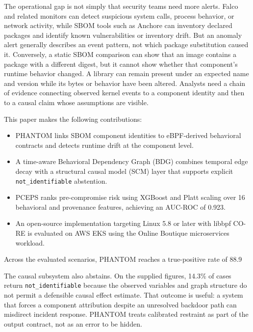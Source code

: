 \documentclass[conference]{IEEEtran}
\begin{document}
The operational gap is not simply that security teams need more alerts. Falco and related monitors can detect suspicious system calls, process behavior, or network activity, while SBOM tools such as Anchore can inventory declared packages and identify known vulnerabilities or inventory drift. But an anomaly alert generally describes an event pattern, not which package substitution caused it. Conversely, a static SBOM comparison can show that an image contains a package with a different digest, but it cannot show whether that component's runtime behavior changed. A library can remain present under an expected name and version while its bytes or behavior have been altered. Analysts need a chain of evidence connecting observed kernel events to a component identity and then to a causal claim whose assumptions are visible.

This paper makes the following contributions:
\begin{itemize}
\item PHANTOM links SBOM component identities to eBPF-derived behavioral contracts and detects runtime drift at the component level.
\item A time-aware Behavioral Dependency Graph (BDG) combines temporal edge decay with a structural causal model (SCM) layer that supports explicit \texttt{not\_identifiable} abstention.
\item PCEPS ranks pre-compromise risk using XGBoost and Platt scaling over 16 behavioral and provenance features, achieving an AUC-ROC of 0.923.
\item An open-source implementation targeting Linux 5.8 or later with libbpf CO-RE is evaluated on AWS EKS using the Online Boutique microservices workload.
\end{itemize}

Across the evaluated scenarios, PHANTOM reaches a true-positive rate of 88.9%

The causal subsystem also abstains. On the supplied figures, 14.3\% of cases return \texttt{not\_identifiable} because the observed variables and graph structure do not permit a defensible causal effect estimate. That outcome is useful: a system that forces a component attribution despite an unresolved backdoor path can misdirect incident response. PHANTOM treats calibrated restraint as part of the output contract, not as an error to be hidden.
\end{document}
